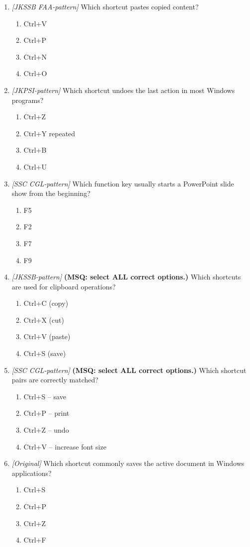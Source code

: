 \begin{enumerate}[label=\textbf{Q\arabic*.}, leftmargin=*]
\item \textit{[JKSSB FAA-pattern]} Which shortcut pastes copied content?
  \begin{enumerate}[label=\Alph*.]
    \item Ctrl+V
    \item Ctrl+P
    \item Ctrl+N
    \item Ctrl+O
  \end{enumerate}
\item \textit{[JKPSI-pattern]} Which shortcut undoes the last action in most Windows programs?
  \begin{enumerate}[label=\Alph*.]
    \item Ctrl+Z
    \item Ctrl+Y repeated
    \item Ctrl+B
    \item Ctrl+U
  \end{enumerate}
\item \textit{[SSC CGL-pattern]} Which function key usually starts a PowerPoint slide show from the beginning?
  \begin{enumerate}[label=\Alph*.]
    \item F5
    \item F2
    \item F7
    \item F9
  \end{enumerate}
\item \textit{[JKSSB-pattern]} \textbf{(MSQ: select ALL correct options.)} Which shortcuts are used for clipboard operations?
  \begin{enumerate}[label=\Alph*.]
    \item Ctrl+C (copy)
    \item Ctrl+X (cut)
    \item Ctrl+V (paste)
    \item Ctrl+S (save)
  \end{enumerate}
\item \textit{[SSC CGL-pattern]} \textbf{(MSQ: select ALL correct options.)} Which shortcut pairs are correctly matched?
  \begin{enumerate}[label=\Alph*.]
    \item Ctrl+S -- save
    \item Ctrl+P -- print
    \item Ctrl+Z -- undo
    \item Ctrl+V -- increase font size
  \end{enumerate}
\item \textit{[Original]} Which shortcut commonly saves the active document in Windows applications?
  \begin{enumerate}[label=\Alph*.]
\item Ctrl+S
   \item Ctrl+P
   \item Ctrl+Z
   \item Ctrl+F
  \end{enumerate}


\end{enumerate}
